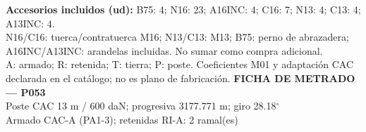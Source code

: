 \begingroup\scriptsize
\textbf{Accesorios incluidos (ud):} B75: 4; N16: 23; A16INC: 4; C16: 7; N13: 4; C13: 4; A13INC: 4.\\
N16/C16: tuerca/contratuerca M16; N13/C13: M13; B75: perno de abrazadera; A16INC/A13INC: arandelas incluidas. No sumar como compra adicional.\\
A: armado; R: retenida; T: tierra; P: poste. Coeficientes M01 y adaptación CAC declarada en el catálogo; no es plano de fabricación.
\endgroup\endgroup
\clearpage{}
\begingroup\small\setlength{\parskip}{3pt}\renewcommand{\arraystretch}{1.05}
\textbf{\large FICHA DE METRADO — P053}\\[4pt]
Poste CAC 13 m / 600 daN; progresiva 3177.771 m; giro 28.18\ensuremath{^\circ}\\
Armado CAC-A (PA1-3); retenidas RI-A: 2 ramal(es)\\
\begingroup\scriptsize
